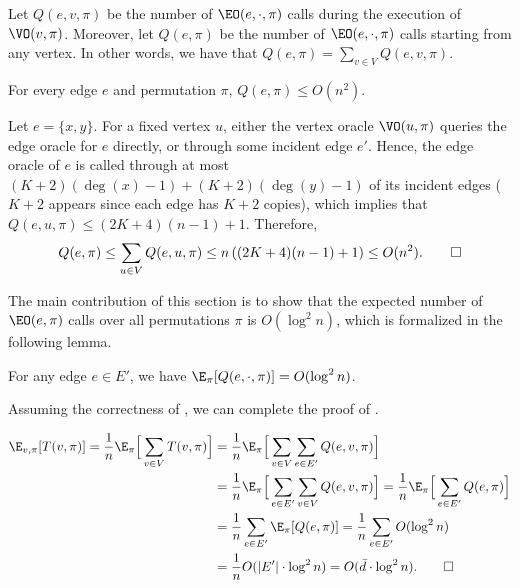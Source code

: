 Let $Q(e, v, \pi)$ be the number of $\EO(e, \cdot, \pi)$ calls during the execution of $\VO(v, \pi)$. Moreover, let $Q(e, \pi)$ be the number of $\EO(e, \cdot, \pi)$ calls starting from any vertex. In other words, we have that $Q(e, \pi) = \sum_{v\in V}Q(e, v, \pi)$. 


\begin{observation}\label{obs: q-upperbound}
For every edge $e$ and permutation $\pi$, $Q(e, \pi) \leq O(n^2)$.
\end{observation}
\begin{myproof}
Let $e = \{x,y\}$. For a fixed vertex $u$, either the vertex oracle $\VO(u, \pi)$ queries the edge oracle for $e$ directly, or through some incident edge $e'$. Hence, the edge oracle of $e$ is called through at most $(K + 2)(\deg(x) - 1) + (K + 2)(\deg(y) - 1)$ of its incident edges ($K+2$ appears since each edge has $K + 2$ copies), which implies that $Q(e, u, \pi) \leq (2K + 4)(n - 1) + 1$. Therefore,
\begin{align*}
    Q(e, \pi) \leq \sum_{u\in V} Q(e, u, \pi) \leq n\left( (2K + 4)(n - 1) + 1 \right) \leq O(n^2).\qedhere
\end{align*}
\end{myproof}


The main contribution of this section is to show that the expected number of $\EO(e, \pi)$ calls over all permutations $\pi$ is $O(\log^2 n)$, which is formalized in the following lemma.

\begin{lemma}\label{lem: query-complexity}
For any edge $e \in E'$, we have $\E_\pi[Q(e, \cdot, \pi)] = O(\log^2 n)$.
\end{lemma}

Assuming the correctness of , we can complete the proof of .

\begin{myproof}
\begin{align*}
    \E_{v, \pi}[T(v, \pi)] = \frac{1}{n}\E_\pi\Big[\sum_{v\in V}T(v,\pi)\Big] & = \frac{1}{n}\E_\pi\Big[\sum_{v\in V}\sum_{e \in E'}Q(e,v,\pi)\Big] \\
    & = \frac{1}{n}\E_\pi\Big[\sum_{e \in E'}\sum_{v\in V}Q(e,v,\pi)\Big] = \frac{1}{n} \E_\pi\Big[\sum_{e \in E'} Q(e, \pi)\Big] \\ 
    & = \frac{1}{n} \sum_{e \in E'} \E_\pi[ Q(e, \pi)] = \frac{1}{n} \sum_{e \in E'} O(\log^2 n) \\
    & = \frac{1}{n} O(|E'|\cdot \log^2 n) = O(\bar{d}\cdot \log^2 n).\qedhere
\end{align*}
\end{myproof}

